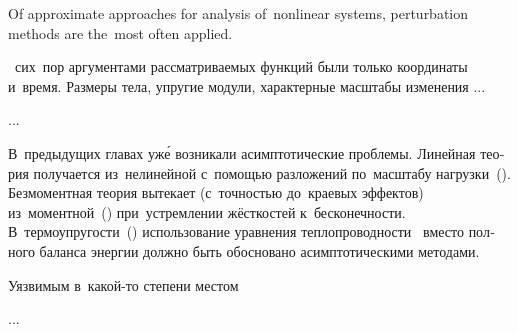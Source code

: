 

\thispagestyle{empty}

\label{chapter:asymptoticperturbationmethods}

{\small
Of approximate approaches for analysis of~nonlinear systems, perturbation methods are the~most often applied.
\par}



\begin{otherlanguage}{russian}

~сих~пор аргументами рассматриваемых функций были только координаты и~время.
Размеры тела, упругие модули, характерные масштабы изменения ...

...


В~предыдущих главах уж\'{е} возникали асимптотические проблемы.
Линейная теория получается из~нелинейной с~помощью разложений по~масштабу нагрузки~().
Безмоментная теория вытекает (с~точностью до~краевых эффектов) из~моментной~() при~устремлении  жёсткостей к~бесконечности.
В~термо\-упругости~() использование уравнения теплопроводности~ вместо полного баланса энергии должно быть обосновано асимпто\-ти\-чес\-кими методами.

Уязвимым в~какой\hbox{-}то степени местом


...



\end{otherlanguage}

